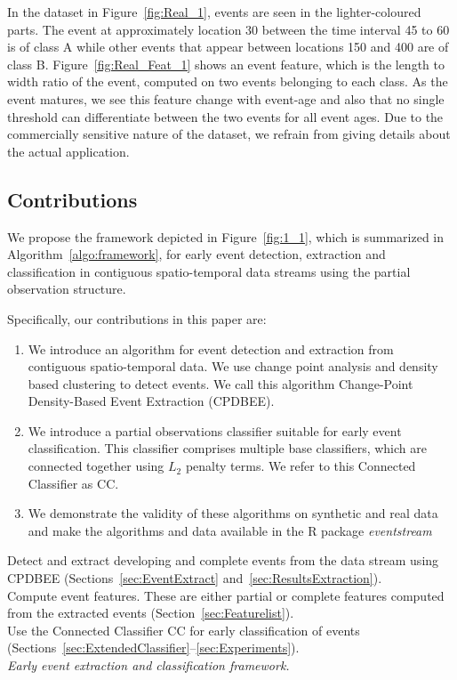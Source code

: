 \documentclass[a4paper,11pt]{article}
\begin{document}
In the dataset in Figure~\ref{fig:Real_1}, events are seen in the lighter-coloured parts. The event at approximately location 30 between the time interval 45 to 60 is of class A while other events that appear between locations 150 and 400 are of class B\@. Figure~\ref{fig:Real_Feat_1} shows an event feature, which is the length to width ratio of the event, computed on two events belonging to each class. As the event matures, we see this feature change with event-age and also that no single threshold can differentiate between the two events for all event ages. Due to the commercially sensitive nature of the dataset, we refrain from giving details about the actual application.

\subsection{Contributions}

We propose the framework depicted in Figure~\ref{fig:1_1}, which is summarized in Algorithm~\ref{algo:framework}, for early event detection, extraction and classification in contiguous spatio-temporal data streams using the partial observation structure.

Specifically, our contributions in this paper are:
\begin{enumerate}
	\item We introduce an algorithm for event detection and extraction  from contiguous spatio-temporal data. We use change point analysis and density based clustering to detect events. We call this algorithm Change-Point Density-Based Event Extraction (CPDBEE).
	\item We introduce a partial observations classifier suitable for early event classification. This classifier comprises multiple base classifiers, which are connected together using $L_2$ penalty terms. We refer to this Connected Classifier as CC\@.
	\item We demonstrate the validity of these algorithms on synthetic and real data and make the algorithms and data available in the R package \textit{eventstream} \citep{eventstream}
\end{enumerate}

\DontPrintSemicolon
\begin{algorithm}\fontsize{9}{10}\selectfont
	Detect and extract developing and complete events from the data stream using CPDBEE (Sections~\ref{sec:EventExtract} and~\ref{sec:ResultsExtraction}). \\
	Compute event features. These are either partial or complete features computed from the extracted events (Section~\ref{sec:Featurelist}). \\
	Use the Connected Classifier CC for early classification of events (Sections~\ref{sec:ExtendedClassifier}--\ref{sec:Experiments}). \\
	\caption{\textit{Early event extraction and classification framework.}}
  \label{algo:framework}
\end{algorithm}
\end{document}
